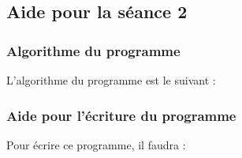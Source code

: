 


\subsection{Aide pour la séance 2}\label{aide_seanceScratch2}

\subsubsection{Algorithme du programme}  

L'algorithme du programme est le suivant :



\subsubsection{Aide pour l'écriture du programme}  

Pour écrire ce programme, il faudra :

